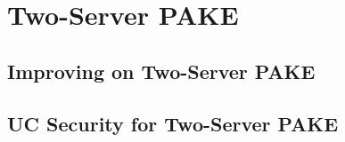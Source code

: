 




\section{Two-Server PAKE} \label{sec:2pake-uc}

\subsection{Improving on Two-Server PAKE}

\subsection{UC Security for Two-Server PAKE}
